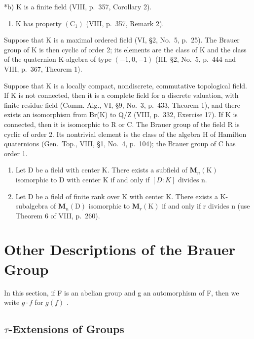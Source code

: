 *b) K is a finite field (VIII, p.~357, Corollary 2).

\begin{enumerate}
\def\labelenumi{\alph{enumi})}
\setcounter{enumi}{2}
\tightlist
\item
  K has property \((\mathrm{C}_1)\) (VIII, p.~357, Remark 2).
\end{enumerate}

Suppose that K is a maximal ordered field (VI, §2, No.~5, p.~25). The Brauer group of K is then cyclic of order 2; its elements are the class of K and the class of the quaternion K-algebra of type \((-1,0,-1)\) (III, §2, No.~5, p.~444 and VIII, p.~367, Theorem 1).

Suppose that K is a locally compact, nondiscrete, commutative topological field. If K is not connected, then it is a complete field for a discrete valuation, with finite residue field (Comm. Alg., VI, §9, No.~3, p.~433, Theorem 1), and there exists an isomorphism from Br(K) to Q/Z (VIII, p.~332, Exercise 17). If K is connected, then it is isomorphic to R or C. The Brauer group of the field R is cyclic of order 2. Its nontrivial element is the class of the algebra H of Hamilton quaternions (Gen.~Top., VIII, §1, No.~4, p.~104); the Brauer group of C has order 1.


\begin{enumerate}
\def\labelenumi{\arabic{enumi})}
\item
  Let D be a field with center K. There exists a subfield of \(\mathbf{M}_{n}(\mathrm{K})\) isomorphic to D with center K if and only if \([D:K]\) divides n.
\item
  Let D be a field of finite rank over K with center K. There exists a K-subalgebra of \(\mathbf{M}_{n}(\mathrm{D})\) isomorphic to \(\mathbf{M}_{r}(\mathrm{K})\) if and only if r divides n (use Theorem 6 of VIII, p.~260).
\end{enumerate}

\section{Other Descriptions of the Brauer Group}

In this section, if F is an abelian group and g an automorphism of F, then we write \(g \cdot f\) for \(g(f)\) .

\subsection{\texorpdfstring{\(\tau\)-Extensions of Groups}{\textbackslash tau-Extensions of Groups}}

